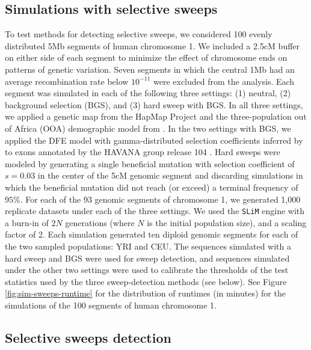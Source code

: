 \documentclass[hidelinks]{article}
\newcommand{\stdpopsim}{\texttt{stdpopsim}\xspace}
\newcommand{\slim}{\texttt{SLiM}\xspace}
\begin{document}
    \subsection*{Simulations with selective sweeps}

    To test methods for detecting selective sweeps, we considered 100 evenly distributed 5Mb
    segments of human chromosome 1.
    We included a 2.5cM buffer on either side of each segment to minimize the effect of chromosome ends on patterns of genetic variation.
    Seven segments in which the central 1Mb had an average recombination rate below $10^{-11}$ were excluded from the analysis.
    Each segment was simulated in each of the following three settings:
    (1) neutral, (2) background selection (BGS), and (3) hard sweep with BGS.
    In all three settings, we applied a genetic map from the HapMap Project
    \citep[\stdpopsim label \texttt{HapMapII\_GRCh38}]{international2007second} and
    the three-population out of Africa (OOA) demographic model from
    \citet[\stdpopsim label \texttt{OutOfAfrica\_3G09}]{gutenkunst2009inferring}.
    In the two settings with BGS, we applied the DFE model with gamma-distributed selection coefficients inferred by
    \citet[\stdpopsim label \texttt{Gamma\_K17}]{kim2017inference} to exons annotated by the HAVANA group release 104
    \citep[\stdpopsim label \texttt{ensembl\_havana\_104\_exons}]{ensembl2018}.
    Hard sweeps were modeled by generating a single beneficial mutation
    with selection coefficient of $s = 0.03$ in the center of the 5cM genomic segment
    and discarding simulations in which the beneficial mutation did not reach (or exceed) a terminal frequency of $95\%$.
    For each of the 93 genomic segments of chromosome 1, we generated 1,000 replicate datasets under each of the three settings.
    We used the \slim engine with a burn-in of $2N$ generations
    (where $N$ is the initial population size), and a scaling factor of 2.
    Each simulation generated ten diploid genomic segments for each of the two sampled populations: YRI and CEU.
    The sequences simulated with a hard sweep and BGS were used for sweep detection,
    and sequences simulated under the other two settings were used to calibrate the thresholds of the test statistics
    used by the three sweep-detection methods (see below).
    See Figure \ref{fig:sim-sweeps-runtime} for the distribution of runtimes (in minutes) for the simulations of the 100 segments of human chromosome 1. 

    \subsection*{Selective sweeps detection}
\end{document}
